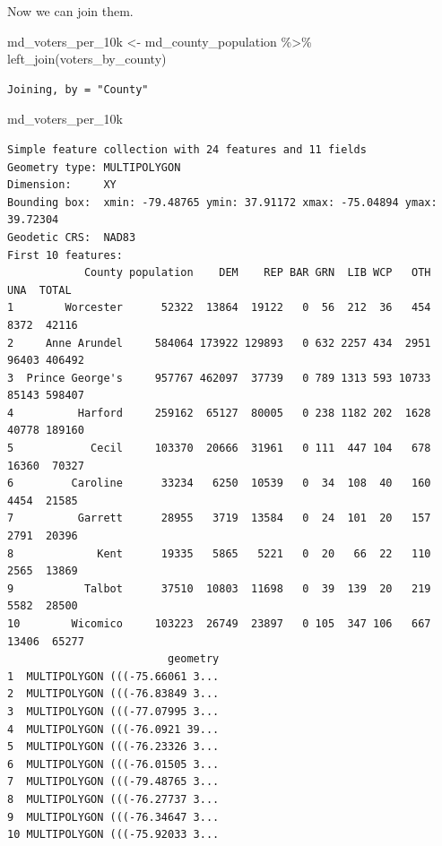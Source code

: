 \documentclass[
  letterpaper,
  DIV=11,
  numbers=noendperiod]{scrreprt}
\newenvironment{Shaded}{\begin{snugshade}}{\end{snugshade}}
\newcommand{\FunctionTok}[1]{\textcolor[rgb]{0.28,0.35,0.67}{#1}}
\newcommand{\NormalTok}[1]{\textcolor[rgb]{0.00,0.23,0.31}{#1}}
\newcommand{\OtherTok}[1]{\textcolor[rgb]{0.00,0.23,0.31}{#1}}
\newcommand{\SpecialCharTok}[1]{\textcolor[rgb]{0.37,0.37,0.37}{#1}}
\begin{document}
Now we can join them.

\begin{Shaded}
\begin{Highlighting}[]
\NormalTok{md\_voters\_per\_10k }\OtherTok{\textless{}{-}}\NormalTok{ md\_county\_population }\SpecialCharTok{\%\textgreater{}\%}
  \FunctionTok{left\_join}\NormalTok{(voters\_by\_county)}
\end{Highlighting}
\end{Shaded}

\begin{verbatim}
Joining, by = "County"
\end{verbatim}

\begin{Shaded}
\begin{Highlighting}[]
\NormalTok{md\_voters\_per\_10k}
\end{Highlighting}
\end{Shaded}

\begin{verbatim}
Simple feature collection with 24 features and 11 fields
Geometry type: MULTIPOLYGON
Dimension:     XY
Bounding box:  xmin: -79.48765 ymin: 37.91172 xmax: -75.04894 ymax: 39.72304
Geodetic CRS:  NAD83
First 10 features:
            County population    DEM    REP BAR GRN  LIB WCP   OTH   UNA  TOTAL
1        Worcester      52322  13864  19122   0  56  212  36   454  8372  42116
2     Anne Arundel     584064 173922 129893   0 632 2257 434  2951 96403 406492
3  Prince George's     957767 462097  37739   0 789 1313 593 10733 85143 598407
4          Harford     259162  65127  80005   0 238 1182 202  1628 40778 189160
5            Cecil     103370  20666  31961   0 111  447 104   678 16360  70327
6         Caroline      33234   6250  10539   0  34  108  40   160  4454  21585
7          Garrett      28955   3719  13584   0  24  101  20   157  2791  20396
8             Kent      19335   5865   5221   0  20   66  22   110  2565  13869
9           Talbot      37510  10803  11698   0  39  139  20   219  5582  28500
10        Wicomico     103223  26749  23897   0 105  347 106   667 13406  65277
                         geometry
1  MULTIPOLYGON (((-75.66061 3...
2  MULTIPOLYGON (((-76.83849 3...
3  MULTIPOLYGON (((-77.07995 3...
4  MULTIPOLYGON (((-76.0921 39...
5  MULTIPOLYGON (((-76.23326 3...
6  MULTIPOLYGON (((-76.01505 3...
7  MULTIPOLYGON (((-79.48765 3...
8  MULTIPOLYGON (((-76.27737 3...
9  MULTIPOLYGON (((-76.34647 3...
10 MULTIPOLYGON (((-75.92033 3...
\end{verbatim}
\end{document}
